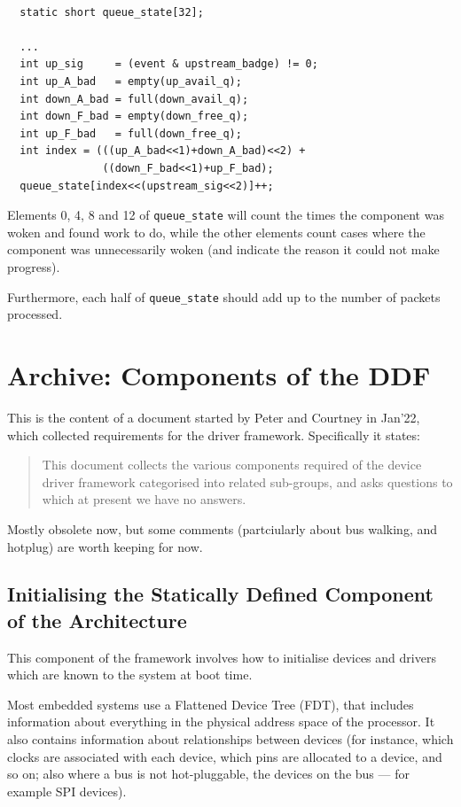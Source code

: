 \documentclass[a4paper,12pt]{report}
\newcommand{\code}[1]{\texttt{#1}}
\begin{document}
\begin{lstlisting}[gobble=2, firstline=2, float=h, label={l:signal_prof},
  caption={Profiling signalling effectiveness.}]

  static short queue_state[32];

  ...
  int up_sig     = (event & upstream_badge) != 0;
  int up_A_bad   = empty(up_avail_q);
  int down_A_bad = full(down_avail_q);
  int down_F_bad = empty(down_free_q);
  int up_F_bad   = full(down_free_q);
  int index = (((up_A_bad<<1)+down_A_bad)<<2) +
               ((down_F_bad<<1)+up_F_bad);
  queue_state[index<<(upstream_sig<<2)]++;
\end{lstlisting}

Elements 0, 4, 8 and 12 of \code{queue\_state} will count the times
the component was woken and found work to do, while the other elements
count cases where the component was unnecessarily woken (and indicate
the reason it could not make progress).

Furthermore, each half of \code{queue\_state} should add up to the
number of packets processed.

\chapter{Archive: Components of the DDF}

This is the content of a document started by Peter and Courtney in
Jan'22, which collected requirements for the driver
framework. Specifically it states:
\begin{quote}
  This document collects the various components required of the device
driver framework categorised into related sub-groups, and asks
questions to which at present we have no answers.
\end{quote}

Mostly obsolete now, but some comments (partciularly about bus
walking, and hotplug) are worth keeping for now.


\section{Initialising the Statically Defined Component of the
  Architecture}

This component of the framework involves how to initialise devices and
drivers which are known to the system at boot time.

Most embedded systems use a Flattened Device Tree (FDT), that includes
information about everything in the physical address space of the
processor.  It also contains information about relationships between
devices (for instance, which clocks are associated with each device,
which pins are allocated to a device, and so on; also where a bus
is not hot-pluggable, the devices on the bus --- for example SPI
devices).
\end{document}
